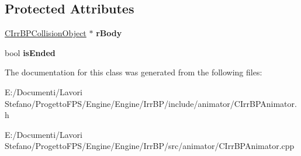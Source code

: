 \subsection*{Protected Attributes}
\begin{DoxyCompactItemize}
\item 
\hypertarget{class_c_irr_b_p_animator_a9b0924dd98d23c3d85f68b70e6f37032}{
\hyperlink{class_c_irr_b_p_collision_object}{CIrrBPCollisionObject} $\ast$ {\bfseries rBody}}
\label{class_c_irr_b_p_animator_a9b0924dd98d23c3d85f68b70e6f37032}

\item 
\hypertarget{class_c_irr_b_p_animator_a3b626ca4dc93b1496d66ce87f315c0ab}{
bool {\bfseries isEnded}}
\label{class_c_irr_b_p_animator_a3b626ca4dc93b1496d66ce87f315c0ab}

\end{DoxyCompactItemize}


The documentation for this class was generated from the following files:\begin{DoxyCompactItemize}
\item 
E:/Documenti/Lavori Stefano/ProgettoFPS/Engine/Engine/IrrBP/include/animator/CIrrBPAnimator.h\item 
E:/Documenti/Lavori Stefano/ProgettoFPS/Engine/Engine/IrrBP/src/animator/CIrrBPAnimator.cpp\end{DoxyCompactItemize}
